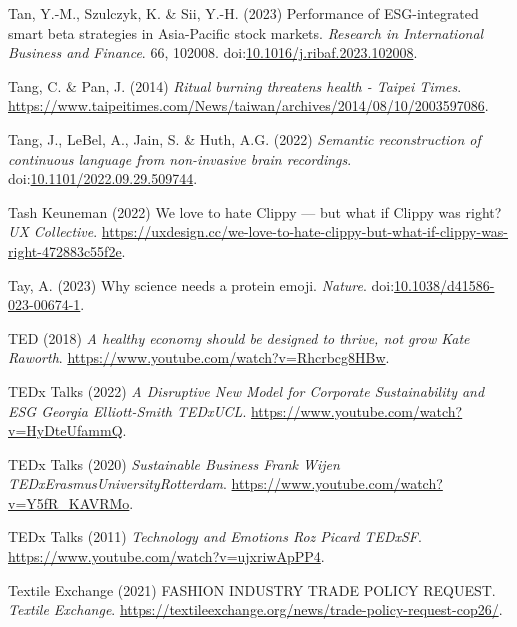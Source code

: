 \documentclass[
  letterpaper,
  DIV=11,
  numbers=noendperiod]{scrartcl}
\newlength{\cslhangindent}
\newenvironment{CSLReferences}[2] %
 {\begin{list}{}{%
  \setlength{\itemindent}{0pt}
  \setlength{\leftmargin}{0pt}
  \setlength{\parsep}{0pt}
  \ifodd #1
   \setlength{\leftmargin}{\cslhangindent}
   \setlength{\itemindent}{-1\cslhangindent}
  \fi
  \setlength{\itemsep}{#2\baselineskip}}}
 {\end{list}}
\begin{document}
\begin{CSLReferences}{0}{1}
Tan, Y.-M., Szulczyk, K. \& Sii, Y.-H. (2023) Performance of
{ESG-integrated} smart beta strategies in {Asia-Pacific} stock markets.
\emph{Research in International Business and Finance}. 66, 102008.
doi:\href{https://doi.org/10.1016/j.ribaf.2023.102008}{10.1016/j.ribaf.2023.102008}.

Tang, C. \& Pan, J. (2014) \emph{Ritual burning threatens health -
{Taipei Times}}.
\url{https://www.taipeitimes.com/News/taiwan/archives/2014/08/10/2003597086}.

Tang, J., LeBel, A., Jain, S. \& Huth, A.G. (2022) \emph{Semantic
reconstruction of continuous language from non-invasive brain
recordings}.
doi:\href{https://doi.org/10.1101/2022.09.29.509744}{10.1101/2022.09.29.509744}.

Tash Keuneman (2022) We love to hate {Clippy} --- but what if {Clippy}
was right? \emph{UX Collective}.
\url{https://uxdesign.cc/we-love-to-hate-clippy-but-what-if-clippy-was-right-472883c55f2e}.

Tay, A. (2023) Why science needs a protein emoji. \emph{Nature}.
doi:\href{https://doi.org/10.1038/d41586-023-00674-1}{10.1038/d41586-023-00674-1}.

TED (2018) \emph{A healthy economy should be designed to thrive, not
grow {\textbar} {Kate Raworth}}.
\url{https://www.youtube.com/watch?v=Rhcrbcg8HBw}.

TEDx Talks (2022) \emph{A {Disruptive New Model} for {Corporate
Sustainability} and {ESG} {\textbar} {Georgia Elliott-Smith} {\textbar}
{TEDxUCL}}. \url{https://www.youtube.com/watch?v=HyDteUfammQ}.

TEDx Talks (2020) \emph{Sustainable {Business} {\textbar} {Frank Wijen}
{\textbar} {TEDxErasmusUniversityRotterdam}}.
\url{https://www.youtube.com/watch?v=Y5fR_KAVRMo}.

TEDx Talks (2011) \emph{Technology and {Emotions} {\textbar} {Roz
Picard} {\textbar} {TEDxSF}}.
\url{https://www.youtube.com/watch?v=ujxriwApPP4}.

Textile Exchange (2021) {FASHION INDUSTRY TRADE POLICY REQUEST}.
\emph{Textile Exchange}.
\url{https://textileexchange.org/news/trade-policy-request-cop26/}.


\end{CSLReferences}
\end{document}
